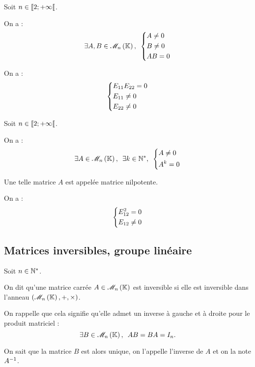 \begin{rem}
Soit \(n\in\left\llbracket2;+\infty\right\llbracket\).

On a : \[\quantifs{\exists A,B\in\M{n}}\begin{dcases}
A\not=0 \\
B\not=0 \\
AB=0
\end{dcases}\]
\end{rem}

\begin{dem}
On a : \[\begin{dcases}
E_{11}E_{22}=0 \\
E_{11}\not=0 \\
E_{22}\not=0
\end{dcases}\]
\end{dem}

\begin{rem}
Soit \(n\in\left\llbracket2;+\infty\right\llbracket\).

On a : \[\quantifs{\exists A\in\M{n};\exists k\in\Ns}\begin{dcases}
A\not=0 \\
A^k=0
\end{dcases}\]

Une telle matrice \(A\) est appelée matrice nilpotente.
\end{rem}

\begin{dem}
On a : \[\begin{dcases}
E_{12}^2=0 \\
E_{12}\not=0
\end{dcases}\]
\end{dem}

\subsection{Matrices inversibles, groupe linéaire}

\begin{defi}
Soit \(n\in\mathbb{N}^*\).

On dit qu'une matrice carrée \(A\in\M{n}\) est inversible si elle est inversible dans l'anneau \(\anneau{\M{n}}\).

On rappelle que cela signifie qu'elle admet un inverse à gauche et à droite pour le produit matriciel : \[\quantifs{\exists B\in\M{n}}AB=BA=I_n.\]

On sait que la matrice \(B\) est alors unique, on l'appelle l'inverse de \(A\) et on la note \(A^{-1}\).
\end{defi}

